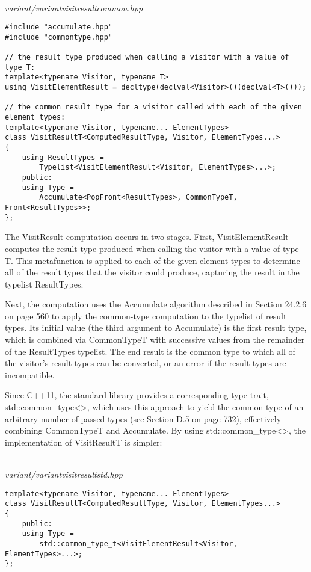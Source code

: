 \hspace*{\fill} \\ %
\noindent
\textit{variant/variantvisitresultcommon.hpp}
\begin{lstlisting}[style=styleCXX]
#include "accumulate.hpp"
#include "commontype.hpp"

// the result type produced when calling a visitor with a value of type T:
template<typename Visitor, typename T>
using VisitElementResult = decltype(declval<Visitor>()(declval<T>()));

// the common result type for a visitor called with each of the given element types:
template<typename Visitor, typename... ElementTypes>
class VisitResultT<ComputedResultType, Visitor, ElementTypes...>
{
	using ResultTypes =
		Typelist<VisitElementResult<Visitor, ElementTypes>...>;
	public:
	using Type =
		Accumulate<PopFront<ResultTypes>, CommonTypeT, Front<ResultTypes>>;
};
\end{lstlisting}

The VisitResult computation occurs in two stages. First, VisitElementResult computes the result type produced when calling the visitor with a value of  type T. This metafunction is applied to each of the given element types to determine all of the result  types that the visitor could produce, capturing the result in the typelist ResultTypes.

Next, the computation uses the Accumulate algorithm described in Section 24.2.6 on page 560 to apply the common-type computation to the typelist of result types. Its initial value (the third argument to Accumulate) is the first result type, which is combined via CommonTypeT with successive values from the remainder of the ResultTypes typelist. The end result is the common type to which all of the visitor’s result types can be converted, or an error if the result types are incompatible.

Since C++11, the standard library provides a corresponding type trait, std::common\_type<>, which uses this approach to yield the common type of an arbitrary number of passed types (see Section D.5 on page 732), effectively combining CommonTypeT and Accumulate. By using std::common\_type<>, the implementation of VisitResultT is simpler:

\hspace*{\fill} \\ %
\noindent
\textit{variant/variantvisitresultstd.hpp}
\begin{lstlisting}[style=styleCXX]
template<typename Visitor, typename... ElementTypes>
class VisitResultT<ComputedResultType, Visitor, ElementTypes...>
{
	public:
	using Type =
		std::common_type_t<VisitElementResult<Visitor, ElementTypes>...>;
};
\end{lstlisting}

